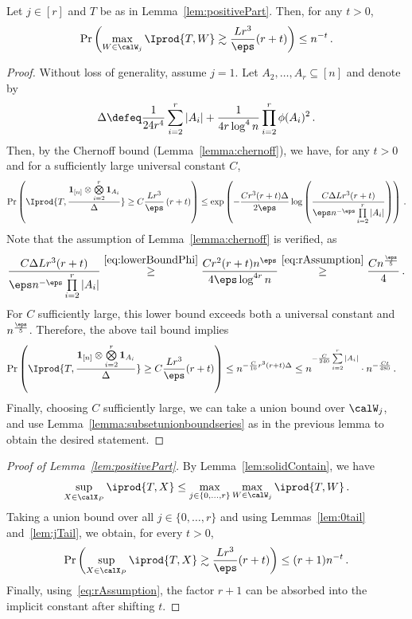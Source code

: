 \documentclass[11pt,a4paper]{article}
\begin{document}
\begin{lemma}\label{lem:jTail}
    Let $j\in [r]$ and $T$ be as in Lemma~\ref{lem:positivePart}.
    Then, for any $t>0$,
    \[
        \Pr\left(\max_{W\in \calW_j} \Iprod{T, W}\gtrsim \frac {Lr^3} \eps(r+t)\right)\le n^{-t}\,.
    \]
\end{lemma}

\begin{proof}
    Without loss of generality, assume $j=1$. Let $A_2, \ldots, A_r\subseteq [n]$ and denote by
    \[
        \Delta \defeq \frac 1{24r^4} \sum_{i=2}^r |A_i| + \frac 1{4r\log^4 n}  \prod_{i=2}^r \phi(A_i)^2\,.
    \]
    Then, by the Chernoff bound (Lemma~\ref{lemma:chernoff}), we have, for any $t>0$ and for a sufficiently large universal constant $C$,
    \[
        \Pr\left(\Iprod{T, \frac {\mathbf 1_{[n]} \otimes \bigotimes\limits_{i=2}^r \mathbf 1_{A_i}} {\Delta}} \ge C\frac {Lr^3} \eps \left(r +t\right) \right)\le \exp\left(-\frac {C r^3(r+t) \Delta} {2\eps} \log \left(\frac {C\Delta Lr^3(r+t)} {\eps n^{- \eps}\prod\limits_{i=2}^r  |A_i|} \right) \right)\,.
    \]
    Note that the assumption of Lemma~\ref{lemma:chernoff} is verified, as
    \[
        \frac {C\Delta Lr^3(r+t)} {\eps n^{-\eps}\prod\limits_{i=2}^r  |A_i|}\overset{\eqref{eq:lowerBoundPhi}} {\ge} \frac {Cr^2(r+t) n^{\eps}} {4\eps\log^{4r} n}\overset{\eqref{eq:rAssumption}}{\ge} \frac {Cn^{\frac \eps5}} {4}\,.
    \]
    For $C$ sufficiently large, this lower bound exceeds both a universal constant and  $n^{\frac \eps5}$. Therefore,
    the above tail bound implies
    \begin{align*}
        \Pr\left(\Iprod{T, \frac {\mathbf 1_{[n]} \otimes \bigotimes\limits_{i=2}^r \mathbf 1_{A_i}} {\Delta}}\ge  C\frac {Lr^3} \eps(r+t) \right)&\le n^{-\frac {C} {10}r^3(r+t) \Delta}
        \le n^{-\frac {C} {240} \sum\limits_{i=2}^r |A_i|} \cdot n^{-\frac {C t} {480}}\,.
    \end{align*}
    Finally, choosing $C$ sufficiently large,
    we can take a union bound over $\calW_j$, and use Lemma~\ref{lemma:subsetunionboundseries} as in the previous lemma to 
    obtain the desired statement.
\end{proof}

\begin{proof}[Proof of Lemma~\ref{lem:positivePart}]
    By Lemma~\ref{lem:solidContain},
    we have
    \[
        \sup_{X\in \calX_P} \iprod{T, X}\le \max_{j\in \{0, \ldots, r\}} \max_{W\in \calW_j} \iprod{T, W}\,.
    \]
    Taking a union bound over all $j\in \{0, \ldots, r\}$ and using Lemmas~\ref{lem:0tail} and~\ref{lem:jTail}, we obtain, for every $t>0$,
    \[
        \Pr\left(\sup_{X\in \calX_P} \iprod{T, X}\gtrsim\frac {Lr^3} \eps(r+t)\right)\le (r+1)n^{-t}\,.
    \]
    Finally, using~\eqref{eq:rAssumption},
    the factor $r+1$ can be absorbed
    into the implicit constant after shifting $t$.
\end{proof}
\end{document}
